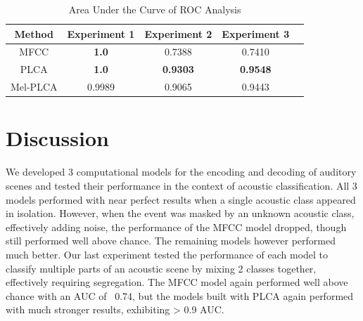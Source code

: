 \documentclass[a4paper,10pt,final]{ThesisStyle}
\begin{document}
\begin{table}
\centering
\caption{Area Under the Curve of ROC Analysis}
\begin{tabular}{|c|c|c|c|l|} \hline
Method&Experiment 1&Experiment 2&Experiment 3\\ \hline
MFCC&\textbf{1.0}&0.7388&0.7410\\ \hline
PLCA&\textbf{1.0}&\textbf{0.9303}&\textbf{0.9548}\\ \hline
Mel-PLCA&0.9989&0.9065&0.9443\\ \hline
\end{tabular}
\end{table}


\section{Discussion}

We developed 3 computational models for the encoding and decoding of auditory scenes and tested their performance in the context of acoustic classification.  All 3 models performed with near perfect results when a single acoustic class appeared in isolation.  However, when the event was masked by an unknown acoustic class, effectively adding noise, the performance of the MFCC model dropped, though still performed well above chance.  The remaining models however performed much better.  Our last experiment tested the performance of each model to classify multiple parts of an acoustic scene by mixing 2 classes together, effectively requiring segregation.  The MFCC model again performed well above chance with an AUC of ~0.74, but the models built with PLCA again performed with much stronger results, exhibiting > 0.9 AUC.
\end{document}
